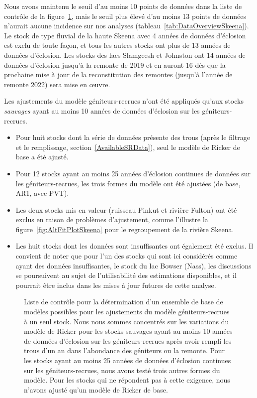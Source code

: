 \documentclass[french,11pt]{book}
\begin{document}
Nous avons maintenu le seuil d'au moins 10 points de données dans la liste de contrôle de la figure~\ref{fig:CandidateModels}, mais le seuil plus élevé d'au moins 13 points de données n'aurait aucune incidence sur nos analyses (tableau~\ref{tab:DataOverviewSkeena}). Le stock de type fluvial de la haute Skeena avec 4 années de données d'éclosion est exclu de toute façon, et tous les autres stocks ont plus de 13 années de données d'éclosion. Les stocks des lacs Slamgeesh et Johnston ont 14 années de données d'éclosion jusqu'à la remonte de 2019 et en auront 16 dès que la prochaine mise à jour de la reconstitution des remontes (jusqu'à l'année de remonte 2022) sera mise en œuvre.

Les ajustements du modèle géniteurs-recrues n'ont été appliqués qu'aux stocks \emph{sauvages} ayant au moins 10 années de données d'éclosion sur les géniteurs-recrues.
\begin{itemize}

\item
  Pour huit stocks dont la série de données présente des trous (après le filtrage et le remplissage, section~\ref{AvailableSRData}), seul le modèle de Ricker de base a été ajusté.
\item
  Pour 12 stocks ayant au moins 25 années d'éclosion continues de données sur les géniteurs-recrues, les trois formes du modèle ont été ajustées (de base, AR1, avec PVT).
\item
  Les deux stocks mis en valeur (ruisseau Pinkut et rivière Fulton) ont été exclus en raison de problèmes d'ajustement, comme l'illustre la figure~\ref{fig:AltFitPlotSkeena} pour le regroupement de la rivière Skeena.
\item
  Les huit stocks dont les données sont insuffisantes ont également été exclus. Il convient de noter que pour l'un des stocks qui sont ici considérés comme ayant des données insuffisantes, le stock du lac Bowser (Nass), les discussions se poursuivent au sujet de l'utilisabilité des estimations disponibles, et il pourrait être inclus dans les mises à jour futures de cette analyse.
\end{itemize}
\clearpage


\begin{figure}[htb]

{\centering {} 

}

\caption{Liste de contrôle pour la détermination d'un ensemble de base de modèles possibles pour les ajustements du modèle géniteurs-recrues à un seul stock. Nous nous sommes concentrés sur les variations du modèle de Ricker pour les stocks sauvages ayant au moins 10 années de données d'éclosion sur les géniteurs-recrues après avoir rempli les trous d'un an dans l'abondance des géniteurs ou la remonte. Pour les stocks ayant au moins 25 années de données d'éclosion continues sur les géniteurs-recrues, nous avons testé trois autres formes du modèle. Pour les stocks qui ne répondent pas à cette exigence, nous n'avons ajusté qu'un modèle de Ricker de base.}\label{fig:CandidateModels}
\end{figure}
\clearpage
\end{document}

